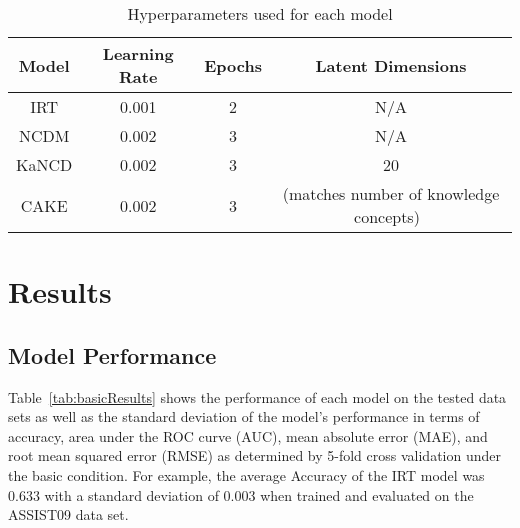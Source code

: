 \documentclass[letterpaper, 12pt, captions=tableabove]{scrreprt}
\begin{document}
		\begin{table}[htbp]
			\centering
			\begin{tabular}{c|ccc}
				Model&Learning Rate&Epochs&Latent Dimensions\\ \hline
				IRT&0.001&2&N/A\\
				NCDM&0.002&3&N/A\\
				KaNCD&0.002&3&20\\
				CAKE&0.002&3&(matches number of knowledge concepts)\
			\end{tabular}
			\caption{Hyperparameters used for each model}
			\label{tab:hyperParams}
		\end{table}			


\chapter{Results}
\label{ch:results}
	\section{Model Performance}
	\label{sec:modelPerformance}

		Table~\ref{tab:basicResults} shows the performance of each model on the tested data sets as well as the standard deviation of the model's performance in terms of accuracy, area under the ROC curve (AUC), mean absolute error (MAE), and root mean squared error (RMSE) as determined by 5-fold cross validation under the basic condition. For example, the average Accuracy of the IRT model was 0.633 with a standard deviation of 0.003 when trained and evaluated on the ASSIST09 data set. 
\end{document}
